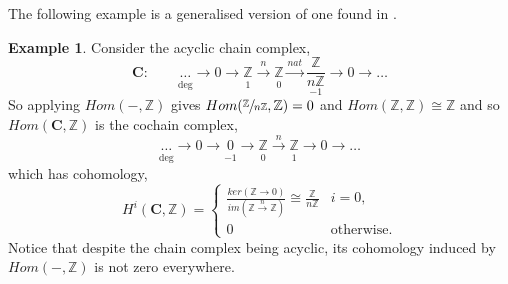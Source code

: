 \documentclass[11.5pt, twoside, a4paper, titlepage]{report}
\providecommand{\bb}[1]{\mathbb{#1}}
\theoremstyle{definition}
\newtheorem{eg}[mydef]{Example}
\theoremstyle{plain}
\begin{document}
The following example is a generalised version of one found in \cite{CB1}.

\begin{eg}
Consider the acyclic chain complex, 
\begin{equation*}
\mathbf{C}: \qquad \underset{\text{deg}}{\underset{}{\dots}} \xrightarrow{}0 \xrightarrow{} \underset{1}{\underset{}{\bb{Z}}} \xrightarrow{n} \underset{0}{\underset{}{\bb{Z}}} \xrightarrow{nat} \underset{-1}{\frac{\bb{Z}}{n\bb{Z}}} \xrightarrow{}0 \xrightarrow{} \dots
\end{equation*}
So applying $Hom(-, \bb{Z})$ gives $Hom(\sfrac{\bb{Z}}{n\bb{Z}}, \bb{Z})=0$ and $Hom(\bb{Z}, \bb{Z})\cong\bb{Z}$ and so $Hom(\mathbf{C}, \bb{Z})$ is the cochain complex,
\begin{equation*}
\underset{\text{deg}}{\underset{}{\dots}} \xrightarrow{}0 \xrightarrow{} \underset{-1}{\underset{}{0}} \xrightarrow{} \underset{0}{\underset{}{\bb{Z}}} \xrightarrow{n} \underset{1}{\underset{}{\bb{Z}}} \xrightarrow{}0 \xrightarrow{} \dots
\end{equation*}
which has cohomology,
\begin{equation*}
H^i(\mathbf{C}, \bb{Z})=
\begin{cases}
\frac{ker(\bb{Z}\to0)}{im(\bb{Z}\xrightarrow{n}\bb{Z})} \cong \frac{\bb{Z}}{n\bb{Z}} & i=0, \\
0 & \text{otherwise.}
\end{cases}
\end{equation*}
Notice that despite the chain complex being acyclic, its cohomology induced by $Hom(-, \bb{Z})$  is not zero everywhere.
\end{eg}
\end{document}

